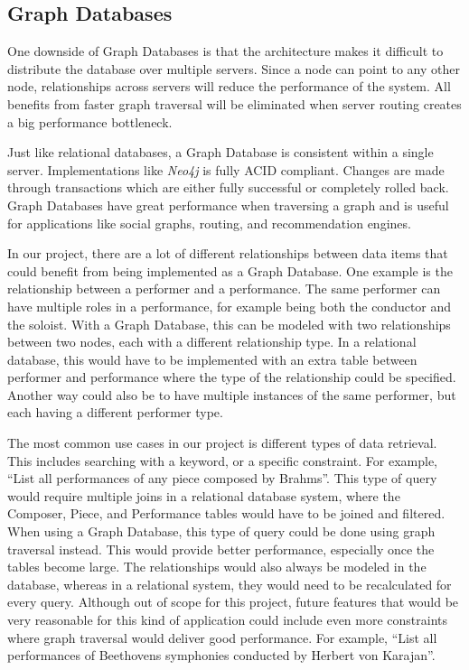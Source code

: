 \subsection{Graph Databases}
\label{analysis-graph-db}

One downside of Graph Databases is that the architecture makes it difficult to distribute the database over multiple servers. Since a node can point to any other node, relationships across servers will reduce the performance of the system. All benefits from faster graph traversal will be eliminated when server routing creates a big performance bottleneck.

Just like relational databases, a Graph Database is consistent within a single server. Implementations like \emph{Neo4j} is fully ACID compliant. Changes are made through transactions which are either fully successful or completely rolled back. Graph Databases have great performance when traversing a graph and is useful for applications like social graphs, routing, and recommendation engines.

In our project, there are a lot of different relationships between data items that could benefit from being implemented as a Graph Database. One example is the relationship between a performer and a performance. The same performer can have multiple roles in a performance, for example being both the conductor and the soloist. With a Graph Database, this can be modeled with two relationships between two nodes, each with a different relationship type. In a relational database, this would have to be implemented with an extra table between performer and performance where the type of the relationship could be specified. Another way could also be to have multiple instances of the same performer, but each having a different performer type.

The most common use cases in our project is different types of data retrieval. This includes searching with a keyword, or a specific constraint. For example, ``List all performances of any piece composed by Brahms''. This type of query would require multiple joins in a relational database system, where the Composer, Piece, and Performance tables would have to be joined and filtered. When using a Graph Database, this type of query could be done using graph traversal instead. This would provide better performance, especially once the tables become large. The relationships would also always be modeled in the database, whereas in a relational system, they would need to be recalculated for every query. Although out of scope for this project, future features that would be very reasonable for this kind of application could include even more constraints where graph traversal would deliver good performance. For example, ``List all performances of Beethovens symphonies conducted by Herbert von Karajan''.

